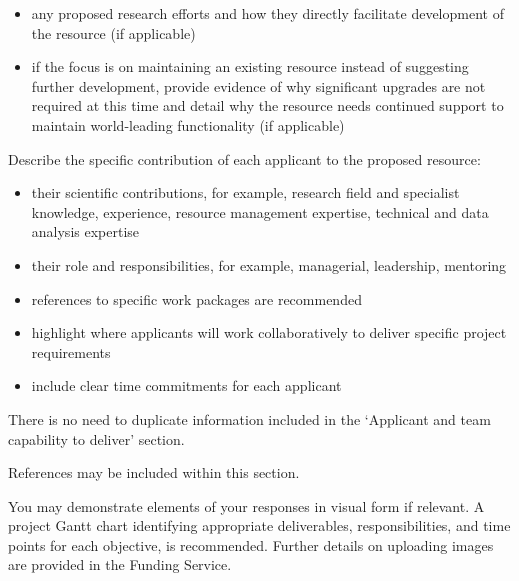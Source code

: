 \documentclass[11pt]{article}
\newenvironment{instruction}{%
    \begin{tcolorbox}[breakable,colback=red!5,colframe=red,title=Instruction]%
	}{%
    	\end{tcolorbox}%
	}
\begin{document}
\begin{instruction}
\begin{itemize}
	\item any proposed research efforts and how they directly facilitate
	development of the resource (if applicable)

	\item if the focus is on maintaining an existing resource instead of
	suggesting further development, provide evidence of why significant
	upgrades are not required at this time and detail why the resource needs
	continued support to maintain world-leading functionality (if applicable)

\end{itemize}

Describe the specific contribution of each applicant to the proposed resource:

\begin{itemize}

	\item their scientific contributions, for example, research field and
	specialist knowledge, experience, resource management expertise, technical
	and data analysis expertise

	\item their role and responsibilities, for example, managerial, leadership,
	mentoring

	\item references to specific work packages are recommended

	\item highlight where applicants will work collaboratively to deliver
	specific project requirements

	\item include clear time commitments for each applicant

\end{itemize}

There is no need to duplicate information included in the ‘Applicant and team
capability to deliver’ section.

References may be included within this section.

You may demonstrate elements of your responses in visual form if relevant. A
project Gantt chart identifying appropriate deliverables, responsibilities, and
time points for each objective, is recommended. Further details on uploading
images are provided in the Funding Service.

\end{instruction}

\begin{bibunit}

\pagebreak
\putbib
\end{bibunit}
\end{document}

